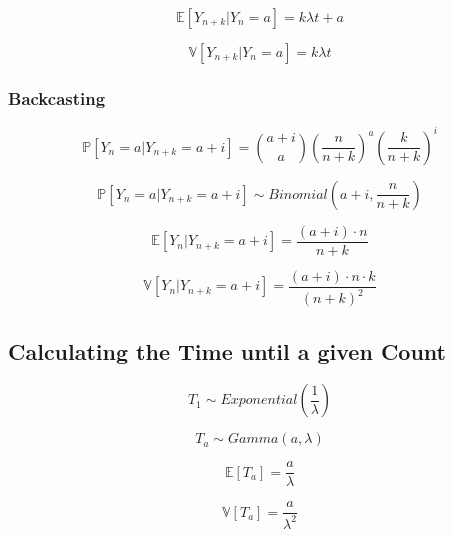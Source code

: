 \documentclass[12pt]{article}
\begin{document}
\begin{equation}
    \mathbb{E}[Y_{n + k} | Y_n = a] = k \lambda t + a
\end{equation}

\begin{equation}
    \mathbb{V}[Y_{n + k} | Y_n = a] = k \lambda t
\end{equation}

\subsubsection{Backcasting}
\begin{equation}
    \mathbb{P}[Y_n = a | Y_{n + k} = a + i ] =
    \binom{a + i}{a} 
    \left(\frac{n}{n + k}\right)^a 
    \left(\frac{k}{n + k}\right)^i
\end{equation}

\begin{equation}
    \mathbb{P}[Y_n = a | Y_{n + k} = a + i ] 
    \sim Binomial\left(a + i, \frac{n}{n+k}\right)
\end{equation}

\begin{equation}
    \mathbb{E}[Y_n | Y_{n + k} = a + i ] =
    \frac{(a + i) \cdot n}{n+k}
\end{equation}

\begin{equation}
    \mathbb{V}[Y_n | Y_{n + k} = a + i ] = 
    \frac{(a + i) \cdot n \cdot k}{(n + k)^2}
\end{equation}

\subsection{Calculating the Time until a given Count}

\begin{equation}
    T_1 \sim Exponential\left(\frac{1}{\lambda}\right)
\end{equation}

\begin{equation}
    T_a \sim Gamma(a, \lambda)
\end{equation}

\begin{equation}
    \mathbb{E}[T_a] = \frac{a}{\lambda}
\end{equation}

\begin{equation}
    \mathbb{V}[T_a] = \frac{a}{\lambda^2}
\end{equation}
\end{document}
